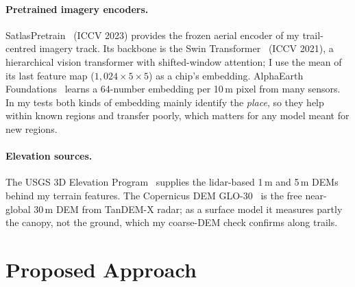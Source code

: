 \documentclass[10pt,twocolumn,letterpaper]{article}
\begin{document}
\paragraph{Pretrained imagery encoders.} SatlasPretrain~\cite{bastani2023satlaspretrain} (ICCV 2023) provides the frozen aerial encoder of my trail-centred imagery track. Its backbone is the Swin Transformer~\cite{liu2021swin} (ICCV 2021), a hierarchical vision transformer with shifted-window attention; I use the mean of its last feature map ($1{,}024\times5\times5$) as a chip's embedding. AlphaEarth Foundations~\cite{brown2025alphaearth} learns a 64-number embedding per 10\,m pixel from many sensors. In my tests both kinds of embedding mainly identify the \emph{place}, so they help within known regions and transfer poorly, which matters for any model meant for new regions.

\paragraph{Elevation sources.} The USGS 3D Elevation Program~\cite{sugarbaker2017status} supplies the lidar-based 1\,m and 5\,m DEMs behind my terrain features. The Copernicus DEM GLO-30~\cite{copernicusdem} is the free near-global 30\,m DEM from TanDEM-X radar; as a surface model it measures partly the canopy, not the ground, which my coarse-DEM check confirms along trails.

\section{Proposed Approach}
\label{sec:approach}
\end{document}

